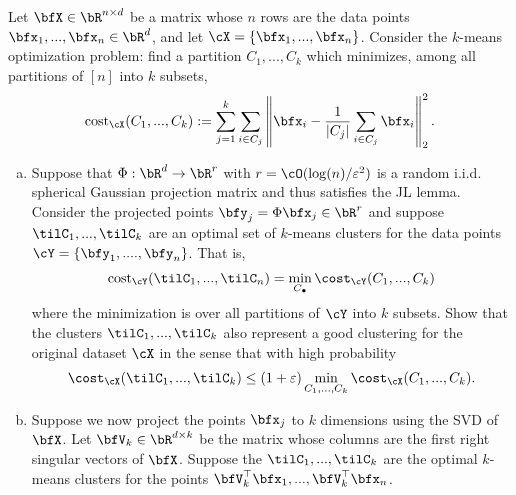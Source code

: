 \begin{homework}[e]
   Let $\bfX\in \bR^{n\times d}$ be a matrix whose $n$ rows are the data points $\bfx_1,...,\bfx_n \in \bR^d$, and let $\cX = \{\bfx_1,...,\bfx_n\}$. Consider the $k$-means optimization problem: find a partition $C_1,...,C_k$ which minimizes, among all partitions of $[n]$ into $k$ subsets,
  \begin{align*}
    \operatorname{cost}_{\cX}(C_1,...,C_k):= \sum_{j=1}^k\sum_{i \in C_j} \left\|\bfx_i - \frac{1}{|C_j|}\sum_{i\in C_j} \bfx_i\right\|^2_2.
  \end{align*}
  \begin{enumerate}[(a)]
    \item Suppose that $\Phi:\bR^d \to \bR^r$ with $r = \cO(\log(n)/\epsilon^2)$ is a random i.i.d. spherical Gaussian projection matrix and thus satisfies the JL lemma. Consider the projected points $\bfy_j = \Phi\bfx_j\in \bR^r$ and suppose $\tilC_1,...,\tilC_k$ are an optimal set of $k$-means clusters for the data points $\cY = \{\bfy_1,....,\bfy_n\}$. That is,
    \begin{align*}
      \operatorname{cost}_{\cY}(\tilC_1,...,\tilC_n) = \min_{C_\bullet}\cost_{\cY}(C_1,...,C_k)
    \end{align*}
    where the minimization is over all partitions of $\cY$ into $k$ subsets. Show that the clusters $\tilC_1,...,\tilC_k$ also represent a good clustering for the original dataset $\cX$ in the sense that with high probability
    \begin{align*}
      \cost_\cX(\tilC_1,...,\tilC_k) \leq (1 + \epsilon)\min_{C_1,...,C_k}\cost_\cX(C_1,...,C_k).
    \end{align*}

  \item Suppose we now project the points $\bfx_j$ to $k$ dimensions using the SVD of $\bfX$. Let $\bfV_k\in \bR^{d\times k}$ be the matrix whose columns are the first right singular vectors of $\bfX$. Suppose the $\tilC_1,...,\tilC_k$ are the optimal $k$-means clusters for the points $\bfV_k^\top\bfx_1,...,\bfV_k^\top\bfx_n$.


\end{enumerate}
\end{homework}
